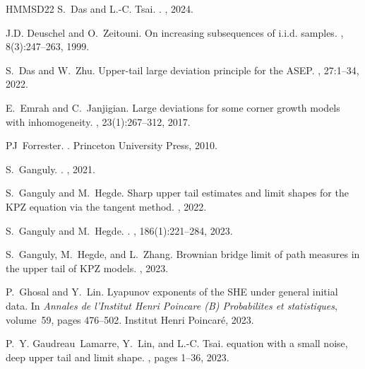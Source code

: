 \documentclass[reqno,11pt]{amsart}
\numberwithin{equation}{section}
\theoremstyle{definition}
\begin{document}
\begin{thebibliography}{HMMSD22}
S.~Das and L.-C. Tsai.
.
, 2024.

J.D. Deuschel and O.~Zeitouni.
\newblock On increasing subsequences of i.i.d. samples.
, 8(3):247–263, 1999.

S.~Das and W.~Zhu.
\newblock Upper-tail large deviation principle for the {ASEP}.
, 27:1--34, 2022.

E.~Emrah and C.~Janjigian.
\newblock Large deviations for some corner growth models with inhomogeneity.
, 23(1):267--312, 2017.

PJ~Forrester.
.
\newblock Princeton University Press, 2010.

S.~Ganguly.
.
, 2021.

S.~Ganguly and M.~Hegde.
\newblock Sharp upper tail estimates and limit shapes for the {KPZ} equation via the tangent method.
, 2022.

S.~Ganguly and M.~Hegde.
.
, 186(1):221--284, 2023.

S.~Ganguly, M.~Hegde, and L.~Zhang.
\newblock Brownian bridge limit of path measures in the upper tail of {KPZ} models.
, 2023.

P.~Ghosal and Y.~Lin.
\newblock Lyapunov exponents of the {SHE} under general initial data.
\newblock In {\em Annales de l'Institut Henri Poincare (B) Probabilites et statistiques}, volume~59, pages 476--502. Institut Henri Poincar{\'e}, 2023.

P.~Y. Gaudreau~Lamarre, Y.~Lin, and L.-C. Tsai.
 equation with a small noise, deep upper tail and limit shape.
, pages 1--36, 2023.


\end{thebibliography}
\end{document}
